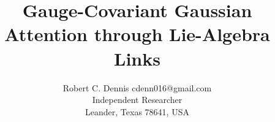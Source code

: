 \documentclass[twoside,11pt]{article}
\begin{document}

\title{Gauge-Covariant Gaussian Attention through Lie-Algebra Links}

\author{\name Robert C. Dennis \email cdenn016@gmail.com \\
  \addr Independent Researcher\\
  \addr Leander, Texas 78641, USA}


\maketitle



\begin{abstract}

\end{abstract}
\end{document}
